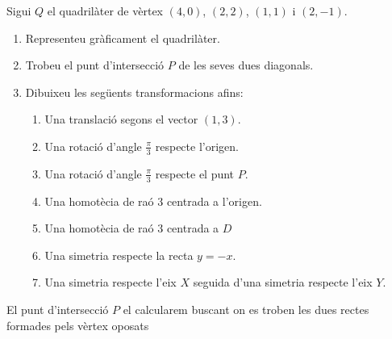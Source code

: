 \Exercise Sigui $Q$ el quadrilàter de vèrtex $(4,0)$, $(2,2)$, $(1,1)$ i $(2,-1)$.
\begin{enumerate}
  \item Representeu gràficament el quadrilàter.
  \item Trobeu el punt d'intersecció $P$ de les seves dues diagonals.
  \item Dibuixeu les següents transformacions afins:
  \begin{enumerate}
    \item Una translació segons el vector $(1,3)$.
    \item Una rotació d'angle $\frac{\pi}{3}$ respecte l'origen.
    \item Una rotació d'angle $\frac{\pi}{3}$ respecte el punt $P$.
    \item Una homotècia de raó 3 centrada a l'origen.
    \item Una homotècia de raó 3 centrada a $D$
    \item Una simetria respecte la recta $y=-x$.
    \item Una simetria respecte l'eix $X$ seguida d'una simetria respecte l'eix $Y$.
  \end{enumerate}
\end{enumerate}

\Answer El punt d'intersecció $P$ el calcularem buscant on es troben les dues rectes formades pels vèrtex oposats

\begin{center}
\end{center}

